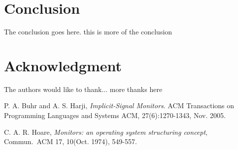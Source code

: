 \documentclass[10pt, conference, compsocconf]{IEEEtran}
\begin{document}
\section{Conclusion} \label{sec:conclu}
The conclusion goes here. this is more of the conclusion



\section*{Acknowledgment}


The authors would like to thank...
more thanks here




%
%
%
\begin{thebibliography}{1}
  P. A. Buhr and A. S. Harji, \emph{Implicit-Signal Monitors}. ACM 
  Transactions on Programming Languages and Systems ACM, 27(6):1270-1343, 
  Nov. 2005.

  C. A. R. Hoare, \emph{Monitors: an operating system structuring concept}, 
  Commun.~ACM 17, 10(Oct. 1974), 549-557.

\end{thebibliography}




\end{document}
